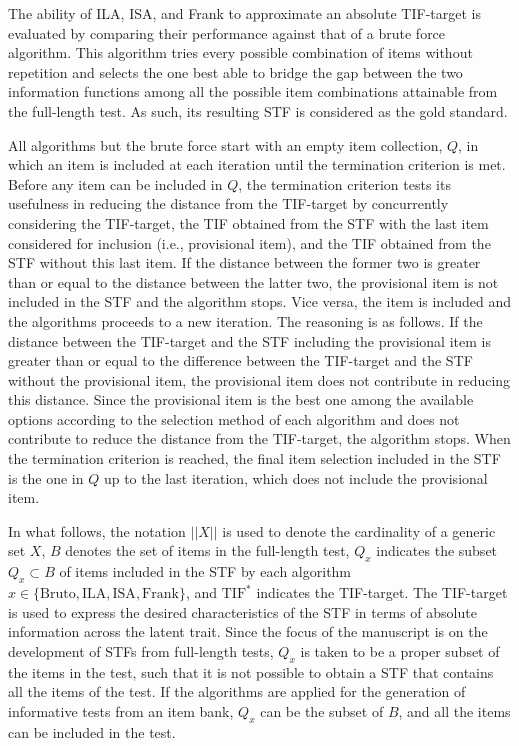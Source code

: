 \documentclass[12pt, a4paper, titilepage]{article}
\begin{document}
The ability of ILA, ISA, and Frank to approximate an absolute TIF-target is evaluated by comparing their performance against that of a brute force algorithm.
This algorithm
 tries every possible combination of items without repetition and selects the one best able to bridge the gap between the two information functions among all the possible item combinations attainable from the full-length test. As such, its resulting STF is considered as the gold standard.


All algorithms but the brute force start with an empty item collection, $Q$, in which an item is included at each iteration until the termination criterion is met.  %
Before any item can be included in $Q$, the termination criterion tests its usefulness in reducing the distance from the TIF-target by concurrently considering the TIF-target, the TIF obtained from the STF with the last item considered for inclusion (i.e., provisional item), and the TIF obtained from the STF without this last item. 
If the distance between the former two is greater than or equal to the distance between the latter two, the provisional item is not included in the STF and the algorithm stops. Vice versa, the item is included and the algorithms proceeds to a new iteration. The reasoning is as follows. If the distance between the TIF-target and the STF including the provisional item is greater than or equal to the difference between the TIF-target and the STF without the provisional item, the provisional item does not contribute in reducing this distance. 
Since the provisional item is the best one among the available options according to the selection method of each algorithm and does not contribute to reduce the distance from the TIF-target, the algorithm stops. 
When the termination criterion is reached, the final item selection included in the STF is the one in $Q$ up to the last iteration, which does not include the provisional item.

In what follows, the notation $||X||$ is used to denote the cardinality of a generic set $X$, $B$ denotes the set of items in the full-length test, $Q_x$ indicates the subset $Q_x \subset B$ of items included in the STF by each algorithm $x \in \{\text{Bruto}, \text{ILA}, \text{ISA}, \text{Frank}\}$, and $\text{TIF}^*$ indicates the TIF-target. The TIF-target is used to express the desired characteristics of the STF in terms of absolute information across the latent trait. 
Since the focus of the manuscript is on the development of STFs from full-length tests, $Q_x$ is taken to be a proper subset of the items in the test, such that it is not possible to obtain a STF that contains all the items of the test. If the algorithms are applied for the generation of informative tests from an item bank, $Q_x$ can be the subset of $B$, and all the items can be included in the test. 
\end{document}
